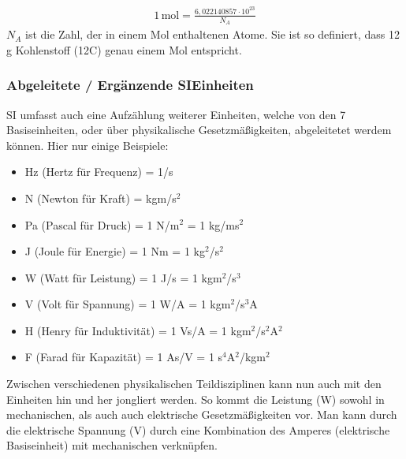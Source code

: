 \documentclass[letterpaper,10pt,english]{jupyterBook}
\begin{document}
\begin{equation*}
\begin{split} 1\,\mathrm{mol} = \frac{6,022 140 857 \cdot 10^23}{N_A}\end{split}
\end{equation*}
\sphinxAtStartPar
\(N_A\) ist die Zahl, der in einem Mol enthaltenen Atome. Sie ist so definiert, dass 12 g Kohlenstoff (12C) genau einem Mol entspricht.

\sphinxAtStartPar
{}


\subsubsection{Abgeleitete / Ergänzende SI\sphinxhyphen{}Einheiten}
\label{\detokenize{content/0_Basics:abgeleitete-erganzende-si-einheiten}}
\sphinxAtStartPar


\sphinxAtStartPar
SI umfasst auch eine Aufzählung weiterer Einheiten, welche von den 7 Basiseinheiten, oder über physikalische Gesetzmäßigkeiten, abgeleitetet werdem können. Hier nur einige Beispiele:
\begin{itemize}
\item {} 
 Hz (Hertz für Frequenz) = 1/s

\item {} 
 N (Newton für Kraft) = kgm/s\(^2\)

\item {} 
 Pa (Pascal für Druck) = 1 N/m\(^2\) = 1 kg/ms\(^2\)

\item {} 
 J (Joule für Energie) = 1 Nm = 1 kg\(^2\)/s\(^2\)

\item {} 
 W (Watt für Leistung) = 1 J/s = 1 kgm\(^2\)/s\(^3\)

\item {} 
 V (Volt für Spannung) = 1 W/A = 1 kgm\(^2\)/s\(^3\)A

\item {} 
 H (Henry für Induktivität) = 1 Vs/A = 1 kgm\(^2\)/s\(^2\)A\(^2\)

\item {} 
 F (Farad für Kapazität) = 1 As/V = 1 s\(^4\)A\(^2\)/kgm\(^2\)

\end{itemize}

\sphinxAtStartPar
Zwischen verschiedenen physikalischen Teildisziplinen kann nun auch mit den Einheiten hin und her jongliert werden. So kommt die Leistung (W) sowohl in mechanischen, als auch auch elektrische Gesetzmäßigkeiten vor. Man kann durch die elektrische Spannung (V) durch eine Kombination des Amperes (elektrische Basiseinheit) mit mechanischen verknüpfen.
\end{document}
